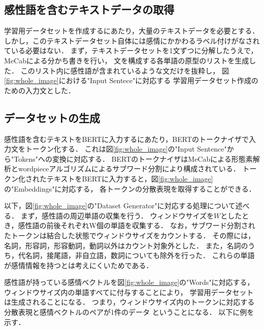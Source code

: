 		\subsection{感性語を含むテキストデータの取得}
			学習用データセットを作成するにあたり，大量のテキストデータを必要とする．
			しかし，このテキストデータセット自体には感情にかかわるラベル付けがなされている必要はない．
			まず，テキストデータセットを1文ずつに分解したうえで，MeCabによる分かち書きを行い，
			文を構成する各単語の原型のリストを生成した．
			このリスト内に感性語が含まれているような文だけを抜粋し，
			図\ref{fig:whole_image}における"Input Sentece"に対応する
			学習用データセット作成のための入力文とした．

		\subsection{データセットの生成}
			感性語を含むテキストをBERTに入力するにあたり，BERTのトークナイザで入力文をトークン化する．
			これは図\ref{fig:whole_image}の"Input Sentence"から"Tokens"への変換に対応する．
			BERTのトークナイザはMeCabによる形態素解析とwordpieceアルゴリズムによるサブワード分割により構成されている．
			トークン化されたテキストをBERTに入力すると，図\ref{fig:whole_image}の"Embeddings"に対応する，
			各トークンの分散表現を取得することができる．

			以下，図\ref{fig:whole_image}の"Dataset Generator"に対応する処理について述べる．
			まず，感性語の周辺単語の収集を行う．
			ウィンドウサイズを$W$としたとき，感性語の前後それぞれW個の単語を収集する．
			なお，サブワード分割されたトークンは結合した状態でウィンドウサイズをカウントする．
			その際には，名詞，形容詞，形容動詞，動詞以外はカウント対象外とした．
			また，名詞のうち，代名詞，接尾語，非自立語，数詞についても除外を行った．
			これらの単語が感情情報を持つとは考えにくいためである．

			感性語が持っている感情ベクトルを図\ref{fig:whole_image}の"Words"に対応する，
			ウィンドウサイズ内の単語すべてに付与することにより，
			学習用データセットは生成されることになる．
			つまり，ウィンドウサイズ内のトークンに対応する分散表現と感情ベクトルのペアが1件のデータ
			ということになる．
			以下に例を示す．

